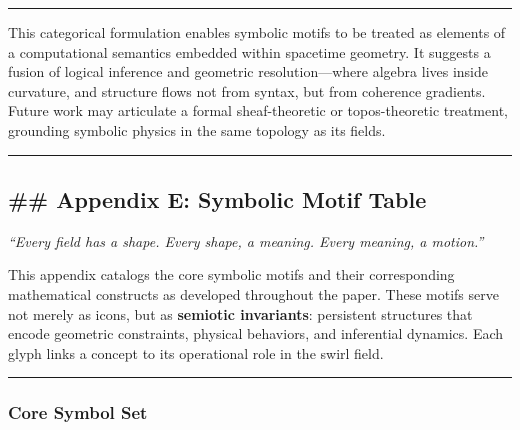 \documentclass[
  11pt,
]{article}
\begin{document}
\begin{center}\rule{0.5\linewidth}{0.5pt}\end{center}

This categorical formulation enables symbolic motifs to be treated as
elements of a computational semantics embedded within spacetime
geometry. It suggests a fusion of logical inference and geometric
resolution---where algebra lives inside curvature, and structure flows
not from syntax, but from coherence gradients. Future work may
articulate a formal sheaf-theoretic or topos-theoretic treatment,
grounding symbolic physics in the same topology as its fields.

\begin{center}\rule{0.5\linewidth}{0.5pt}\end{center}

\subsection{\#\# Appendix E: Symbolic Motif
Table}\label{appendix-e-symbolic-motif-table}

\emph{``Every field has a shape. Every shape, a meaning. Every meaning,
a motion.''}

This appendix catalogs the core symbolic motifs and their corresponding
mathematical constructs as developed throughout the paper. These motifs
serve not merely as icons, but as \textbf{semiotic invariants}:
persistent structures that encode geometric constraints, physical
behaviors, and inferential dynamics. Each glyph links a concept to its
operational role in the swirl field.

\begin{center}\rule{0.5\linewidth}{0.5pt}\end{center}

\subsubsection{\texorpdfstring{\textbf{Core Symbol
Set}}{Core Symbol Set}}\label{core-symbol-set}
\end{document}
